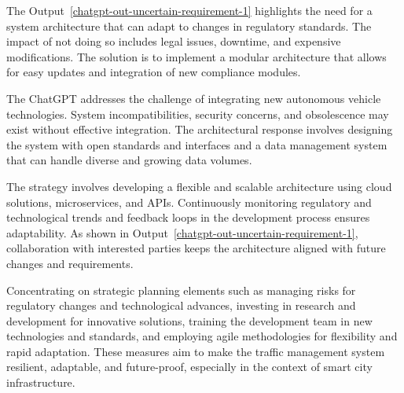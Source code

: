 The Output~\ref{chatgpt-out-uncertain-requirement-1} highlights the need for a system architecture that can adapt to changes in regulatory standards. The impact of not doing so includes legal issues, downtime, and expensive modifications. The solution is to implement a modular architecture that allows for easy updates and integration of new compliance modules. 

The ChatGPT addresses the challenge of integrating new autonomous vehicle technologies. System incompatibilities, security concerns, and obsolescence may exist without effective integration. The architectural response involves designing the system with open standards and interfaces and a data management system that can handle diverse and growing data volumes.

The strategy involves developing a flexible and scalable architecture using cloud solutions, microservices, and APIs. Continuously monitoring regulatory and technological trends and feedback loops in the development process ensures adaptability. As shown in Output~\ref{chatgpt-out-uncertain-requirement-1}, collaboration with interested parties keeps the architecture aligned with future changes and requirements.
 
Concentrating on strategic planning elements such as managing risks for regulatory changes and technological advances, investing in research and development for innovative solutions, training the development team in new technologies and standards, and employing agile methodologies for flexibility and rapid adaptation. These measures aim to make the traffic management system resilient, adaptable, and future-proof, especially in the context of smart city infrastructure.

